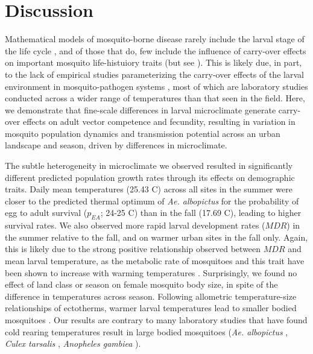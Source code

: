 \documentclass[12pt]{article}
\begin{document}
\section{Discussion}

Mathematical models of mosquito-borne disease rarely include the larval stage of the life cycle \citep{reiner2013}, and of those that do, few include the influence of carry-over effects on important mosquito life-histuiory traits (but see \citep{roux2015a}). This is likely due, in part, to the lack of empirical studies parameterizing the carry-over effects of the larval environment in mosquito-pathogen systems \citep{parham2015}, most of which are laboratory studies conducted across a wider range of temperatures than that seen in the field. Here, we demonstrate that fine-scale differences in larval microclimate generate carry-over effects on adult vector competence and fecundity, resulting in variation in mosquito population dynamics and transmission potential across an urban landscape and season, driven by differences in microclimate.

The subtle heterogeneity in microclimate we observed resulted in significantly different predicted population growth rates through its effects on demographic traits. Daily mean temperatures (25.43 \degree C) across all sites in the summer were closer to the predicted thermal optimum of \textit{Ae. albopictus} for the probability of egg to adult survival ($p_{EA}$; 24-25 \degree C) \citep{mordecai2017} than in the fall (17.69 \degree C), leading to higher survival rates. We also observed more rapid larval development rates ($MDR$) in the summer relative to the fall, and on warmer urban sites in the fall only. Again, this is likely due to the strong positive relationship observed between $MDR$ and  mean larval temperature, as the metabolic rate of mosquitoes and this trait have been shown to increase with warming temperatures \citep{delatte2009}. Surprisingly, we found no effect of land class or season on female mosquito body size, in spite of the difference in temperatures across season. Following allometric temperature-size relationships of ectotherms, warmer larval temperatures lead to smaller bodied mosquitoes \citep{angilleta2004,kingsolver2008}. Our results are contrary to many laboratory studies that have found cold rearing temperatures result in large bodied mosquitoes (\textit{Ae. albopictus} \citep{reiskind2012a}, \textit{Culex tarsalis} \citep{dodson2012}, \textit{Anopheles gambiea} \citep{koella1996}).
\end{document}
